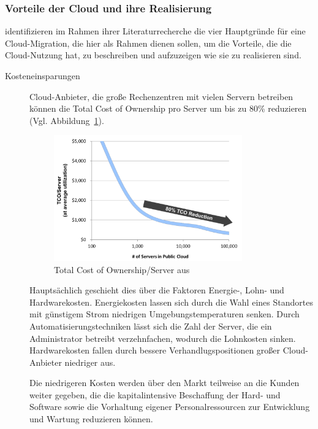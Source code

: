\subsubsection{Vorteile der Cloud und ihre Realisierung}
\label{cha:vorteile_der_cloud}
 identifizieren im Rahmen ihrer 
Literaturrecherche die vier Hauptgründe für eine Cloud-Migration, die hier als 
Rahmen dienen sollen, um die Vorteile, die die Cloud-Nutzung hat, zu 
beschreiben und aufzuzeigen wie sie zu realisieren sind.
\begin{description}
	\item[Kosteneinsparungen] Cloud-Anbieter, die große Rechenzentren  
mit vielen Servern betreiben können die Total Cost of Ownership pro Server um 
bis zu 80\% reduzieren (Vgl. Abbildung~\ref{fig:tco_reduction}). 
\begin{figure}[!h]
\begin{center}
\includegraphics[width=0.8\textwidth]{images/tco_reduction.png}
\caption{Total Cost of Ownership/Server 
aus \protect{}}
\label{fig:tco_reduction}
\end{center}
\end{figure}
 Hauptsächlich geschieht dies über die Faktoren Energie-, Lohn- und 
Hardwarekosten. Energiekosten lassen sich durch die Wahl eines Standortes 
mit günstigem Strom niedrigen Umgebungstemperaturen senken. Durch 
Automatisierungstechniken lässt sich die Zahl der Server, die ein Administrator 
betreibt verzehnfachen, wodurch die Lohnkosten sinken. Hardwarekosten fallen 
durch bessere Verhandlugspositionen großer Cloud-Anbieter niedriger aus. 

Die niedrigeren Kosten werden über den Markt teilweise an die Kunden weiter 
gegeben, die die kapitalintensive Beschaffung der Hard- und Software sowie die 
Vorhaltung eigener Personalressourcen zur Entwicklung und Wartung reduzieren 
können.  


\end{description}
